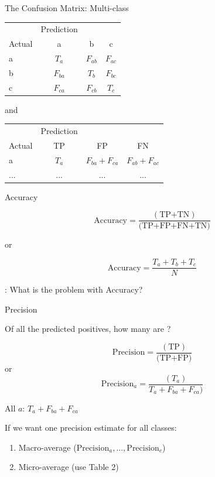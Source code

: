\documentclass[10pt]{beamer}
\begin{document}
\begin{frame}{The Confusion Matrix: Multi-class}

\centering
\begin{tabular}{lccc}
  & Prediction &  \\
  Actual & a & b & c \\
  a & $T_a$ & $F_{ab}$ & $F_{ac}$ \\
  b & $F_{ba}$ & $T_b$ & $F_{bc}$ \\
  c & $F_{ca}$ & $F_{cb}$ & $T_c$ \\
\end{tabular}
and
\centering
\begin{tabular}{lccc}
  & Prediction &  \\
  Actual & TP & FP & FN \\
  a & $T_a$ & $F_{ba} + F_{ca}$ & $F_{ab} + F_{ac}$ \\
  ... & ... & ... & ...
\end{tabular}



\end{frame}


\begin{frame}{Accuracy}


\[
\text{Accuracy} = \frac{(\text{TP+TN})}{\text{(TP+FP+FN+TN)}}
\]

or

\[
\text{Accuracy} = \frac{T_a + T_b + T_c}{N}
\]

\pause


: What is the problem with Accuracy?

\end{frame}


\begin{frame}{Precision}

Of all the predicted positives, how many are ?

\[
\text{Precision} = \frac{(\text{TP})}{\text{(TP+FP)}}
\]
or
\[
\text{Precision}_a = \frac{(T_a)}{T_a + F_{ba} + F_{ca})}
\]

All  $a$: $T_a + F_{ba} + F_{ca}$

If we want one precision estimate for all classes:
\begin{enumerate}
\item Macro-average ($\text{Precision}_a, ..., \text{Precision}_c$)
\item Micro-average (use Table 2)
\end{enumerate}

\end{frame}
\end{document}
